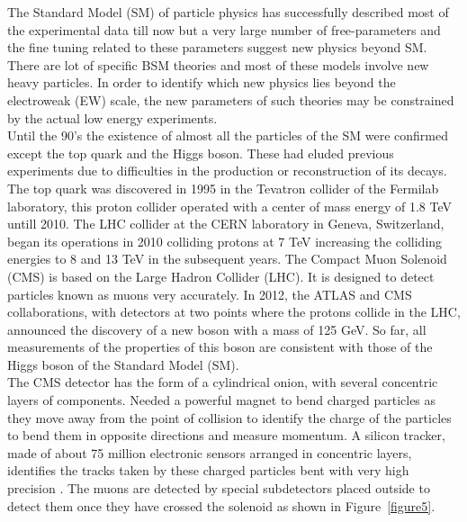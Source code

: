 \documentclass[final,3p]{CSP}
\begin{document}
\clearpage

 \newpage

The Standard Model (SM) of particle physics has successfully described most of the experimental data till now but a very large 
number of free-parameters and the fine tuning related to these parameters suggest new physics beyond SM. There are lot of specific 
BSM theories and most of these models involve new heavy particles. In order to identify which new physics lies beyond the 
electroweak (EW) scale, the new parameters  of such theories may be constrained by the actual low energy experiments. \\ 

Until the 90's the existence of almost all the particles of the SM were confirmed except the top quark and the Higgs boson. 
These had eluded previous experiments due to difficulties in the production or reconstruction of its decays. The top quark was 
discovered in 1995 in the Tevatron collider of the Fermilab laboratory, this proton collider operated with a center of mass 
energy of 1.8 TeV untill 2010. The LHC collider at the CERN laboratory in Geneva, Switzerland, began its operations in 2010 
colliding protons at 7 TeV increasing the colliding energies to 8 and 13 TeV in the subsequent years. The Compact Muon Solenoid (CMS) is based on the Large Hadron Collider (LHC). It is designed to detect particles known as muons very accurately. In 2012, the ATLAS and CMS collaborations, with detectors at two points where the protons collide in the LHC, announced the discovery of a new boson with a mass of 125 GeV. So far, all measurements of the properties of this boson are consistent with those of the Higgs boson of the Standard Model (SM). \\

The CMS detector has the form of a cylindrical onion, with several concentric layers of components. Needed a powerful magnet to bend charged particles as they move away from the point of collision to identify the charge of the particles to bend them in opposite directions and measure momentum. A silicon tracker, made of about 75 
million electronic sensors arranged in concentric layers, identifies the tracks taken by these charged particles bent with very high precision \cite{Chatrchyan:2008aa}. The muons are detected by special subdetectors placed outside to detect them once they have crossed the solenoid as shown in Figure~\ref{figure5}.
\end{document}
